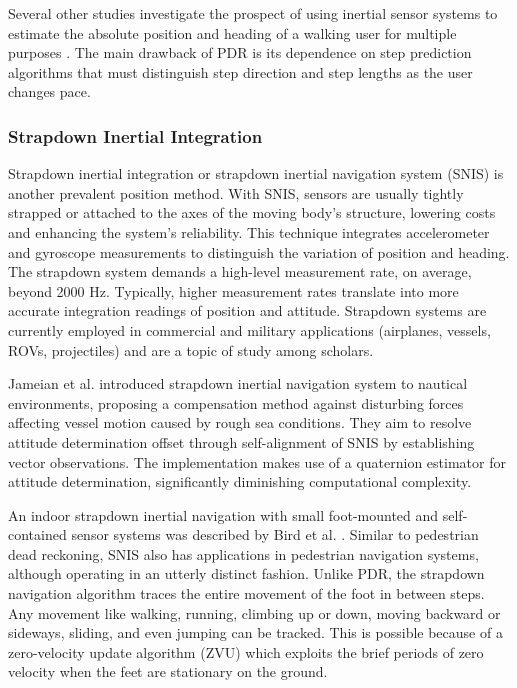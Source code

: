 Several other studies investigate the prospect of using inertial sensor systems to estimate the absolute position and heading of a walking user for multiple purposes \cite{steinhoff2010dead}\cite{weinberg2002using}\cite{kim2004step} \cite{collin2002mems}. The main drawback of PDR is its dependence on step prediction algorithms that must distinguish step direction and step lengths as the user changes pace.

\subsubsection{Strapdown Inertial Integration}
Strapdown inertial integration or strapdown inertial navigation system (SNIS) is another prevalent position method. With SNIS, sensors are usually tightly strapped or attached to the axes of the moving body’s structure, lowering costs and enhancing the system’s reliability. This technique integrates accelerometer and gyroscope measurements to distinguish the variation of position and heading. The strapdown system demands a high-level measurement rate, on average, beyond 2000 Hz. Typically, higher measurement rates translate into more accurate integration readings of position and attitude. Strapdown systems are currently employed in commercial and military applications (airplanes, vessels, ROVs, projectiles) and are a topic of study among scholars.

Jameian et al. \cite{jameian2019robust}  introduced strapdown inertial navigation system to nautical environments, proposing a compensation method against disturbing forces affecting vessel motion caused by rough sea conditions. They aim to resolve attitude determination offset through self-alignment of SNIS by establishing vector observations. The implementation makes use of a quaternion estimator for attitude determination, significantly diminishing computational complexity.

An indoor strapdown inertial navigation with small foot-mounted and self-contained sensor systems was described by Bird et al. \cite{bird2011indoor}. Similar to pedestrian dead reckoning, SNIS also has applications in pedestrian navigation systems, although operating in an utterly distinct fashion. Unlike PDR, the strapdown navigation algorithm traces the entire movement of the foot in between steps. Any movement like walking, running, climbing up or down, moving backward or sideways, sliding, and even jumping can be tracked. This is possible because of a zero-velocity update algorithm (ZVU) which exploits the brief periods of zero velocity when the feet are stationary on the ground.

